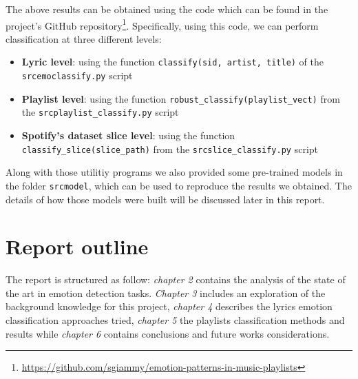 The above results can be obtained using the code which can be found in the project's GitHub repository\footnote{\url{https://github.com/sgiammy/emotion-patterns-in-music-playlists}}. Specifically, using this code, we can perform classification at three different levels:
\begin{itemize}
\item \textbf{Lyric level}: using the function \texttt{classify(sid, artist, title)} of the \texttt{src\/emoclassify.py} script
\item \textbf{Playlist level}: using the function \texttt{robust\_classify(playlist\_vect)} from the \texttt{src\/playlist\_classify.py} script
\item \textbf{Spotify's dataset slice level}: using the function \texttt{classify\_slice(slice\_path)} from the \texttt{src\/slice\_classify.py} script
\end{itemize}

Along with those utilitiy programs we also provided some pre-trained models in the folder \texttt{src\/model}, which can be used to reproduce the results we obtained. The details of how those models were built will be discussed later in this report.

\section{Report outline}

The report is structured as follow: \textit{chapter 2} contains the analysis of the state of the art in emotion detection tasks. \textit{Chapter 3} includes an exploration of the background knowledge for this project, \textit{chapter 4} describes the lyrics emotion classification approaches tried, \textit{chapter 5} the playlists classification methods and results while \textit{chapter 6} contains conclusions and future works considerations. 